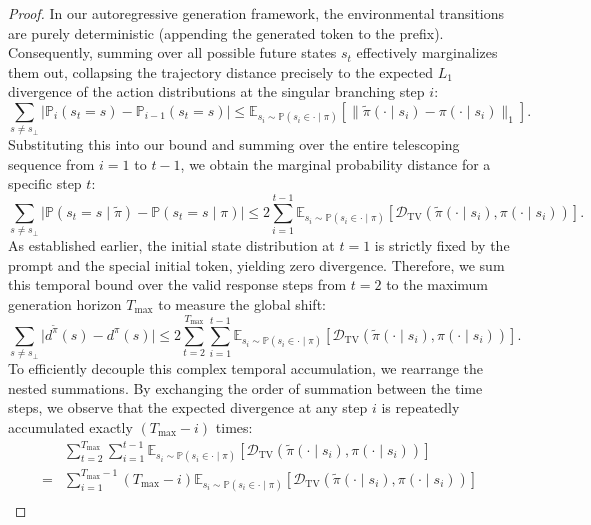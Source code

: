 \documentclass{article}
\theoremstyle{plain}
\theoremstyle{definition}
\theoremstyle{remark}
\begin{document}
\begin{proof}
	In our autoregressive generation framework, the environmental transitions are purely deterministic (appending the generated token to the prefix). Consequently, summing over all possible future states $s_t$ effectively marginalizes them out, collapsing the trajectory distance precisely to the expected $L_1$ divergence of the action distributions at the singular branching step $i$:
	\begin{equation}
		\sum_{s \neq s_\bot}\lvert\mathbb{P}_i(s_t = s) - \mathbb{P}_{i-1}(s_t = s)\rvert \leq \mathbb{E}_{s_i \sim \mathbb{P}(s_i\in\cdot\mid\pi)}\left[ \lVert\tilde{\pi}(\cdot \mid s_i) - \pi(\cdot \mid s_i)\rVert_1 \right].
	\end{equation}
	Substituting this into our bound and summing over the entire telescoping sequence from $i=1$ to $t-1$, we obtain the marginal probability distance for a specific step $t$:
	\begin{equation}
		\sum_{s \neq s_\bot}\lvert\mathbb{P}(s_t = s \mid \tilde{\pi}) - \mathbb{P}(s_t = s \mid \pi)\rvert \leq 2\sum_{i=1}^{t-1} \mathbb{E}_{s_i \sim \mathbb{P}(s_i\in\cdot\mid\pi)}\left[\mathcal{D}_{\mathrm{TV}}(\tilde{\pi}(\cdot \mid s_i), \pi(\cdot \mid s_i))\right].
	\end{equation}
	As established earlier, the initial state distribution at $t=1$ is strictly fixed by the prompt and the special initial token, yielding zero divergence. Therefore, we sum this temporal bound over the valid response steps from $t=2$ to the maximum generation horizon $T_{\max}$ to measure the global shift:
	\begin{equation}
		\sum_{s \neq s_\bot} \lvert d^{\tilde{\pi}}(s) - d^\pi(s) \rvert \leq 2\sum_{t=2}^{T_{\max}}\sum_{i=1}^{t-1} \mathbb{E}_{s_i \sim \mathbb{P}(s_i\in\cdot\mid\pi)}\left[\mathcal{D}_{\mathrm{TV}}(\tilde{\pi}(\cdot \mid s_i), \pi(\cdot \mid s_i))\right].
	\end{equation}
	To efficiently decouple this complex temporal accumulation, we rearrange the nested summations. By exchanging the order of summation between the time steps, we observe that the expected divergence at any step $i$ is repeatedly accumulated exactly $(T_{\max} - i)$ times:
	\begin{equation}
		\begin{split}
			&\sum_{t=2}^{T_{\max}}\sum_{i=1}^{t-1} \mathbb{E}_{s_i \sim \mathbb{P}(s_i\in\cdot\mid\pi)}\left[\mathcal{D}_{\mathrm{TV}}(\tilde{\pi}(\cdot \mid s_i), \pi(\cdot \mid s_i))\right]\\ =& \sum_{i=1}^{T_{\max}-1} (T_{\max} - i) \mathbb{E}_{s_i \sim \mathbb{P}(s_i\in\cdot\mid\pi)}\left[\mathcal{D}_{\mathrm{TV}}(\tilde{\pi}(\cdot \mid s_i), \pi(\cdot \mid s_i))\right]\\

\end{split}
\end{equation}
\end{proof}
\end{document}
